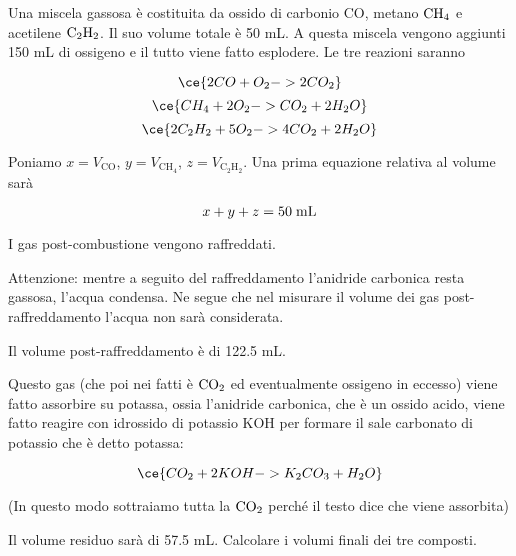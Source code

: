 \newpage

\begin{esercizio}[$\bigstar$]
    Una miscela gassosa è costituita da ossido di carbonio CO, metano $\rm CH_4$ e acetilene $\rm C_2H_2$. Il suo volume totale è 50 mL. A questa miscela vengono aggiunti 150 mL di ossigeno e il tutto viene fatto esplodere\footnotemark. Le tre reazioni saranno

$$\ce{2CO + O_2 -> 2CO_2}$$
$$\ce{CH_4 + 2O_2 -> CO_2 + 2H_2O}$$
$$\ce{2C_2H_2 + 5O_2 -> 4CO_2 + 2H_2O}$$

Poniamo $x=V_{\text{CO}}$, $y=V_{\text{CH}_4}$, $z=V_{\text{C}_2\text{H}_2}$. Una prima equazione relativa al volume sarà

$$x+y+z=50 \; \rm mL$$

I gas post-combustione vengono raffreddati.

Attenzione: mentre a seguito del raffreddamento l'anidride carbonica resta gassosa, l'acqua condensa. Ne segue che nel misurare il volume dei gas post-raffreddamento l'acqua non sarà considerata.

Il volume post-raffreddamento è di 122.5 mL.

Questo gas (che poi nei fatti è $\rm CO_2$ ed eventualmente ossigeno in eccesso) viene fatto assorbire su potassa, ossia l'anidride carbonica, che è un ossido acido, viene fatto reagire con idrossido di potassio KOH per formare il sale carbonato di potassio che è detto potassa:

$$\ce{CO_2 + 2KOH -> K_2CO_3 + H_2O}$$

(In questo modo sottraiamo tutta la $\rm CO_2$ perché il testo dice che viene assorbita)

Il volume residuo sarà di 57.5 mL. Calcolare i volumi finali dei tre composti.
\end{esercizio}
